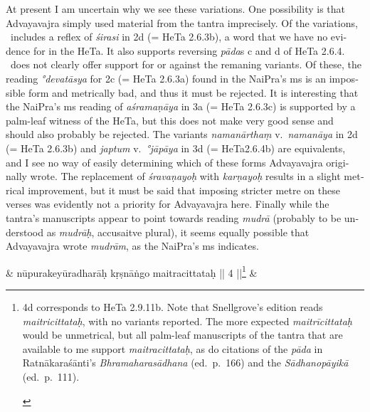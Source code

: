 \documentclass[naipra.tex]{subfiles}
\begin{document}
\begin{sanskrit}
{\begin{english}
		At present I am uncertain why we see these variations.
		One possibility is that Advayavajra simply used material from the tantra imprecisely.
		Of the variations, \TIB\ includes a reflex of \emph{śirasi} in 2d (= HeTa 2.6.3b), a word that we have no evidence for in the HeTa.
		It also supports reversing \emph{pāda}s c and d of HeTa 2.6.4.
		\TIB\ does not clearly offer support for or against the remaning variants. 
		Of these, the reading \emph{°devatāsya} for 2c (= HeTa 2.6.3a) found in the NaiPra's ms is an impossible form and metrically bad, and thus it must be rejected.
		It is interesting that the NaiPra's ms reading of \emph{aśramaṇāya} in 3a (= HeTa 2.6.3c) is supported by a palm-leaf witness of the HeTa, but this does not make very good sense and should also probably be rejected.
		The variants \emph{namanārthaṃ} v.\ \emph{namanāya} in 2d (= HeTa 2.6.3b) and \emph{japtum} v.\ \emph{°jāpāya} in 3d (= HeTa2.6.4b) are equivalents, and I see no way of easily determining which of these forms Advayavajra originally wrote.
		The replacement of \emph{śravaṇayoḥ} with \emph{karṇayoḥ} results in a slight metrical improvement, but it must be said that imposing stricter metre on these verses was evidently not a priority for Advayavajra here. 
		Finally while the tantra's manuscripts appear to point towards reading \emph{mudrā} (probably to be understood as \emph{mudrāḥ}, accusaitve plural), it seems equally possible that Advayavajra wrote \emph{mudrām}, as the NaiPra's ms indicates.
	\end{english}
} &
nūpurakeyūradharāḥ kṛṣnāṅgo maitracittataḥ || 4 ||\footnote{\begin{english}
	4d corresponds to HeTa 2.9.11b.
	Note that Snellgrove's edition reads \emph{maitricittataḥ}, with no variants reported.
	The more expected \emph{maitrīcittataḥ} would be unmetrical, but all palm-leaf manuscripts of the tantra that are available to me support \emph{maitracittataḥ}, as do citations of the \emph{pāda} in Ratnākaraśānti's \emph{Bhramaharasādhana} (ed.\ p.\ 166) and the \emph{Sādhanopāyikā} (ed.\ p.\ 111). 
\end{english}} \&



\end{sanskrit}
\end{document}
